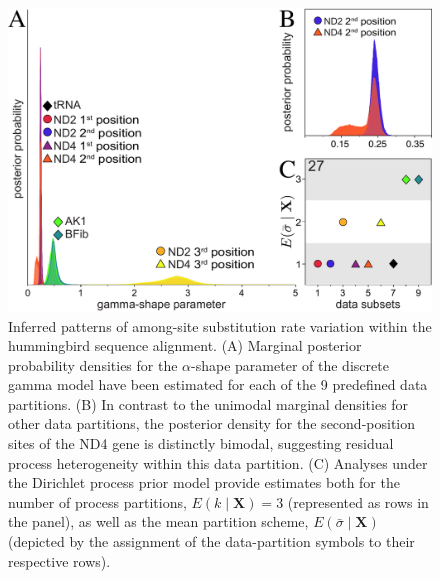 \documentclass[11pt]{article}
\begin{document}
\newpage

\begin{figure}[h] 
\centering 
\includegraphics[width=120mm]{figures/figure_1.pdf} 
\caption{Inferred patterns of among-site substitution rate variation within the hummingbird sequence alignment.  (A) Marginal posterior probability densities for the $\alpha$-shape parameter of the discrete gamma model have been estimated for each of the 9 predefined data partitions.  (B) In contrast to the unimodal marginal densities for other data partitions, the posterior density for the second-position sites of the ND4 gene is distinctly bimodal, suggesting residual process heterogeneity within this data partition.  (C) Analyses under the Dirichlet process prior model provide estimates both for the number of process partitions, $E(k \mid \mathbf{X}) = 3$ (represented as rows in the panel), as well as the mean partition scheme, $E(\bar{\sigma} \mid \mathbf{X})$ (depicted by the assignment of the data-partition symbols to their respective rows).}
\label{results_example}
\end{figure} 

\newpage
\end{document}
